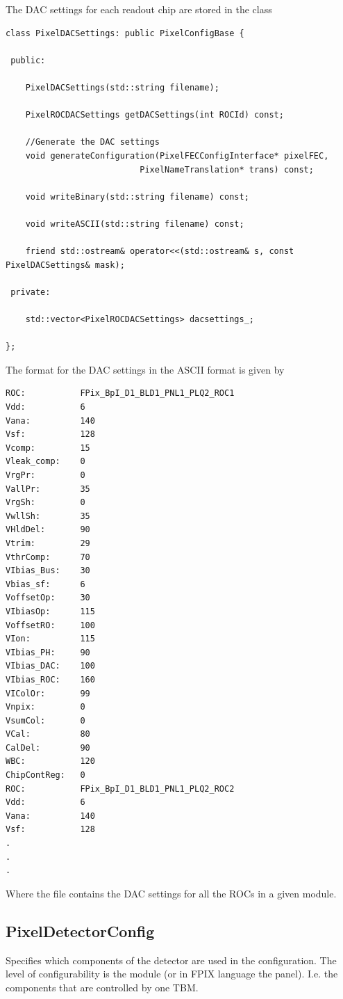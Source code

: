 The DAC settings for each readout chip are stored in the class

\begin{verbatim}
class PixelDACSettings: public PixelConfigBase {

 public:

    PixelDACSettings(std::string filename);

    PixelROCDACSettings getDACSettings(int ROCId) const;

    //Generate the DAC settings
    void generateConfiguration(PixelFECConfigInterface* pixelFEC,
	                       PixelNameTranslation* trans) const; 

    void writeBinary(std::string filename) const;

    void writeASCII(std::string filename) const;

    friend std::ostream& operator<<(std::ostream& s, const PixelDACSettings& mask);

 private:

    std::vector<PixelROCDACSettings> dacsettings_;   
 
};

\end{verbatim}
The format for the DAC settings in the ASCII format is given by
\begin{verbatim}
ROC:           FPix_BpI_D1_BLD1_PNL1_PLQ2_ROC1
Vdd:           6
Vana:          140
Vsf:           128
Vcomp:         15
Vleak_comp:    0
VrgPr:         0
VallPr:        35
VrgSh:         0
VwllSh:        35
VHldDel:       90
Vtrim:         29
VthrComp:      70
VIbias_Bus:    30
Vbias_sf:      6
VoffsetOp:     30
VIbiasOp:      115
VoffsetRO:     100
VIon:          115
VIbias_PH:     90
VIbias_DAC:    100
VIbias_ROC:    160
VIColOr:       99
Vnpix:         0
VsumCol:       0
VCal:          80
CalDel:        90
WBC:           120
ChipContReg:   0
ROC:           FPix_BpI_D1_BLD1_PNL1_PLQ2_ROC2
Vdd:           6
Vana:          140
Vsf:           128
.
.
.
\end{verbatim}
Where the file contains the DAC settings for all the ROCs in a given module.

\subsection{PixelDetectorConfig}

Specifies which components of the detector are used in the configuration.
The level of configurability is the module (or in FPIX language 
the panel). I.e. the
components that are controlled by one TBM.

